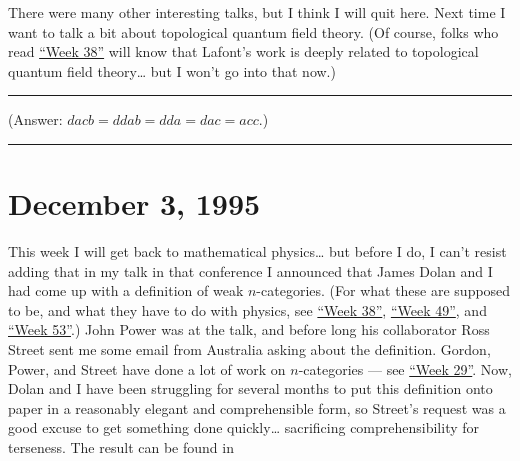 \documentclass{article}
\renewcommand{\texttt}[1]{%
  \begingroup
  \ttfamily
  \begingroup\lccode`~=`/\lowercase{\endgroup\def~}{/\discretionary{}{}{}}%
  \begingroup\lccode`~=`[\lowercase{\endgroup\def~}{[\discretionary{}{}{}}%
  \begingroup\lccode`~=`.\lowercase{\endgroup\def~}{.\discretionary{}{}{}}%
  \catcode`/=\active\catcode`[=\active\catcode`.=\active
  \scantokens{#1\noexpand}%
  \endgroup
}
\begin{document}

There were many other interesting talks, but I think I will quit here.
Next time I want to talk a bit about topological quantum field theory.
(Of course, folks who read \protect\hyperlink{week38}{``Week 38''} will
know that Lafont's work is deeply related to topological quantum field
theory\ldots{} but I won't go into that now.)

\begin{center}\rule{0.5\linewidth}{0.5pt}\end{center}

(Answer: \(dacb = ddab = dda = dac = acc\).)

\begin{center}\rule{0.5\linewidth}{0.5pt}\end{center}



\hypertarget{week71}{%
\section{December 3, 1995}\label{week71}}

This week I will get back to mathematical physics\ldots{} but before I
do, I can't resist adding that in my talk in that conference I announced
that James Dolan and I had come up with a definition of weak
\(n\)-categories. (For what these are supposed to be, and what they have
to do with physics, see \protect\hyperlink{week38}{``Week 38''},
\protect\hyperlink{week49}{``Week 49''}, and
\protect\hyperlink{week53}{``Week 53''}.) John Power was at the talk,
and before long his collaborator Ross Street sent me some email from
Australia asking about the definition. Gordon, Power, and Street have
done a lot of work on \(n\)-categories --- see
\protect\hyperlink{week29}{``Week 29''}. Now, Dolan and I have been
struggling for several months to put this definition onto paper in a
reasonably elegant and comprehensible form, so Street's request was a
good excuse to get something done quickly\ldots{} sacrificing
comprehensibility for terseness. The result can be found in
\end{document}
